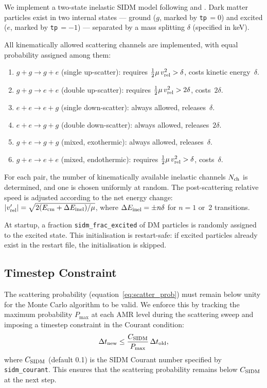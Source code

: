 \documentclass[fleqn,usenatbib]{mnras}
\newcommand{\code}[1]{\texttt{#1}}
\newcommand{\vrel}{v_{\rm rel}}
\begin{document}
We implement a two-state inelastic SIDM model following
\citet{TuckerSmith2001} and \citet{Vogelsberger2019}.  Dark matter
particles exist in two internal states --- ground ($g$, marked by
\code{tp}$\,=0$) and excited ($e$, marked by \code{tp}$\,=-1$) ---
separated by a mass splitting $\delta$ (specified in keV).

All kinematically allowed scattering channels are implemented, with
equal probability assigned among them:
\begin{enumerate}
\item $g + g \to g + e$ (single up-scatter): requires
  $\frac{1}{2}\mu\,\vrel^2 > \delta$, costs kinetic energy~$\delta$.

\item $g + g \to e + e$ (double up-scatter): requires
  $\frac{1}{2}\mu\,\vrel^2 > 2\delta$, costs~$2\delta$.

\item $e + e \to e + g$ (single down-scatter): always allowed,
  releases~$\delta$.

\item $e + e \to g + g$ (double down-scatter): always allowed,
  releases~$2\delta$.

\item $g + e \to g + g$ (mixed, exothermic): always allowed,
  releases~$\delta$.

\item $g + e \to e + e$ (mixed, endothermic): requires
  $\frac{1}{2}\mu\,\vrel^2 > \delta$, costs~$\delta$.
\end{enumerate}
For each pair, the number of kinematically available inelastic
channels $N_{\rm ch}$ is determined, and one is chosen uniformly at
random.  The post-scattering relative speed is adjusted according to
the net energy change:
$|\vrel'| = \sqrt{2(E_{\rm cm} + \Delta E_{\rm inel})/\mu}$,
where $\Delta E_{\rm inel} = \pm n\delta$ for $n = 1$ or~2
transitions.

At startup, a fraction \code{sidm\_frac\_excited} of DM particles is
randomly assigned to the excited state.  This initialisation is
restart-safe: if excited particles already exist in the restart file,
the initialisation is skipped.

\subsection{Timestep Constraint}
\label{sec:sidm_timestep}

The scattering probability (equation~\ref{eq:scatter_prob}) must
remain below unity for the Monte Carlo algorithm to be valid.  We
enforce this by tracking the maximum probability $P_{\max}$ at each
AMR level during the scattering sweep and imposing a timestep
constraint in the Courant condition:
\begin{equation}
\Delta t_{\rm new} \le \frac{C_{\rm SIDM}}{P_{\max}}\,\Delta t_{\rm old},
\label{eq:sidm_dt}
\end{equation}
where $C_{\rm SIDM}$ (default 0.1) is the SIDM Courant number
specified by \code{sidm\_courant}.  This ensures that the scattering
probability remains below $C_{\rm SIDM}$ at the next step.
\end{document}
